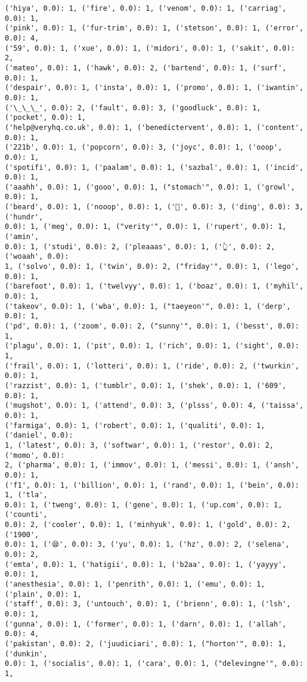 \documentclass[11pt]{article}
\begin{document}
\begin{Verbatim}[commandchars=\\\{\}]
('hiya', 0.0): 1, ('fire', 0.0): 1, ('venom', 0.0): 1, ('carriag', 0.0): 1,
('pink', 0.0): 1, ('fur-trim', 0.0): 1, ('stetson', 0.0): 1, ('error', 0.0): 4,
('59', 0.0): 1, ('xue', 0.0): 1, ('midori', 0.0): 1, ('sakit', 0.0): 2,
('mateo', 0.0): 1, ('hawk', 0.0): 2, ('bartend', 0.0): 1, ('surf', 0.0): 1,
('despair', 0.0): 1, ('insta', 0.0): 1, ('promo', 0.0): 1, ('iwantin', 0.0): 1,
('\_\_\_', 0.0): 2, ('fault', 0.0): 3, ('goodluck', 0.0): 1, ('pocket', 0.0): 1,
('help@veryhq.co.uk', 0.0): 1, ('benedictervent', 0.0): 1, ('content', 0.0): 1,
('221b', 0.0): 1, ('popcorn', 0.0): 3, ('joyc', 0.0): 1, ('ooop', 0.0): 1,
('spotifi', 0.0): 1, ('paalam', 0.0): 1, ('sazbal', 0.0): 1, ('incid', 0.0): 1,
('aaahh', 0.0): 1, ('gooo', 0.0): 1, ("stomach'", 0.0): 1, ('growl', 0.0): 1,
('beard', 0.0): 1, ('nooop', 0.0): 1, ('🎉', 0.0): 3, ('ding', 0.0): 3, ('hundr',
0.0): 1, ('meg', 0.0): 1, ("verity'", 0.0): 1, ('rupert', 0.0): 1, ('amin',
0.0): 1, ('studi', 0.0): 2, ('pleaaas', 0.0): 1, ('👆', 0.0): 2, ('woaah', 0.0):
1, ('solvo', 0.0): 1, ('twin', 0.0): 2, ("friday'", 0.0): 1, ('lego', 0.0): 1,
('barefoot', 0.0): 1, ('twelvyy', 0.0): 1, ('boaz', 0.0): 1, ('myhil', 0.0): 1,
('takeov', 0.0): 1, ('wba', 0.0): 1, ("taeyeon'", 0.0): 1, ('derp', 0.0): 1,
('pd', 0.0): 1, ('zoom', 0.0): 2, ("sunny'", 0.0): 1, ('besst', 0.0): 1,
('plagu', 0.0): 1, ('pit', 0.0): 1, ('rich', 0.0): 1, ('sight', 0.0): 1,
('frail', 0.0): 1, ('lotteri', 0.0): 1, ('ride', 0.0): 2, ('twurkin', 0.0): 1,
('razzist', 0.0): 1, ('tumblr', 0.0): 1, ('shek', 0.0): 1, ('609', 0.0): 1,
('mugshot', 0.0): 1, ('attend', 0.0): 3, ('plsss', 0.0): 4, ('taissa', 0.0): 1,
('farmiga', 0.0): 1, ('robert', 0.0): 1, ('qualiti', 0.0): 1, ('daniel', 0.0):
1, ('latest', 0.0): 3, ('softwar', 0.0): 1, ('restor', 0.0): 2, ('momo', 0.0):
2, ('pharma', 0.0): 1, ('immov', 0.0): 1, ('messi', 0.0): 1, ('ansh', 0.0): 1,
('f1', 0.0): 1, ('billion', 0.0): 1, ('rand', 0.0): 1, ('bein', 0.0): 1, ('tla',
0.0): 1, ('tweng', 0.0): 1, ('gene', 0.0): 1, ('up.com', 0.0): 1, ('counti',
0.0): 2, ('cooler', 0.0): 1, ('minhyuk', 0.0): 1, ('gold', 0.0): 2, ('1900',
0.0): 1, ('😪', 0.0): 3, ('yu', 0.0): 1, ('hz', 0.0): 2, ('selena', 0.0): 2,
('emta', 0.0): 1, ('hatigii', 0.0): 1, ('b2aa', 0.0): 1, ('yayyy', 0.0): 1,
('anesthesia', 0.0): 1, ('penrith', 0.0): 1, ('emu', 0.0): 1, ('plain', 0.0): 1,
('staff', 0.0): 3, ('untouch', 0.0): 1, ('brienn', 0.0): 1, ('lsh', 0.0): 1,
('gunna', 0.0): 1, ('former', 0.0): 1, ('darn', 0.0): 1, ('allah', 0.0): 4,
('pakistan', 0.0): 2, ('juudiciari', 0.0): 1, ("horton'", 0.0): 1, ('dunkin',
0.0): 1, ('socialis', 0.0): 1, ('cara', 0.0): 1, ("delevingne'", 0.0): 1,

\end{Verbatim}
\end{document}
